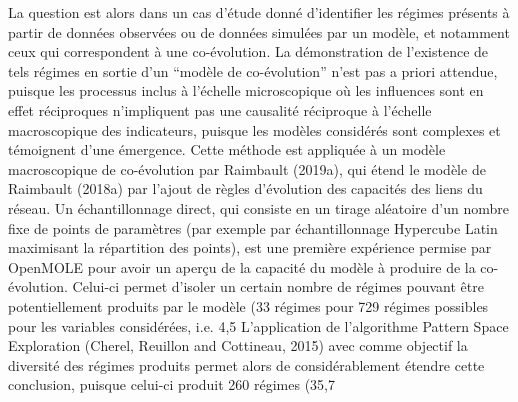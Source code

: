 \documentclass[10pt]{article}
\begin{document}
La question est alors dans un cas d'étude donné d’identifier les régimes présents à partir de données observées ou de données simulées par un modèle, et notamment ceux qui correspondent à une co-évolution. La démonstration de l’existence de tels régimes en sortie d’un “modèle de co-évolution” n’est pas a priori attendue, puisque les processus inclus à l'échelle microscopique où les influences sont en effet réciproques n’impliquent pas une causalité réciproque à l'échelle macroscopique des indicateurs, puisque les modèles considérés sont complexes et témoignent d’une émergence. Cette méthode est appliquée à un modèle macroscopique de co-évolution par Raimbault (2019a), qui étend le modèle de Raimbault (2018a) par l’ajout de règles d'évolution des capacités des liens du réseau. Un échantillonnage direct, qui consiste en un tirage aléatoire d’un nombre fixe de points de paramètres (par exemple par échantillonnage Hypercube Latin maximisant la répartition des points), est une première expérience permise par OpenMOLE pour avoir un aperçu de la capacité du modèle à produire de la co-évolution. Celui-ci permet d’isoler un certain nombre de régimes pouvant être potentiellement produits par le modèle (33 régimes pour 729 régimes possibles pour les variables considérées, i.e.  4,5%
L’application de l’algorithme Pattern Space Exploration (Cherel, Reuillon and Cottineau, 2015) avec comme objectif la diversité des régimes produits permet alors de considérablement étendre cette conclusion, puisque celui-ci produit 260 régimes (35,7%
\end{document}
